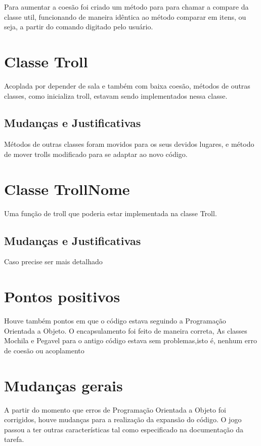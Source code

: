 \documentclass[runningheads,a4paper]{llncs}
\begin{document}
Para aumentar a coesão foi criado um método para para chamar a compare da classe util, funcionando de maneira idêntica ao método comparar em itens, ou seja, a partir do comando digitado pelo usuário. 

\section{Classe Troll}

Acoplada por depender de sala e também com baixa coesão, métodos de outras classes, como inicializa troll, estavam sendo implementados nessa classe.

\subsection{Mudanças e Justificativas}

Métodos de outras classes foram movidos para os seus devidos lugares, e método de mover trolls modificado para se adaptar ao novo código.

\section{Classe TrollNome}

Uma função de troll que poderia estar implementada na classe Troll. 

\subsection{Mudanças e Justificativas}

Caso precise ser mais detalhado

\section{Pontos positivos}

Houve também pontos em que o código estava seguindo a Programação Orientada a Objeto. O encapsulamento foi feito de maneira correta, As classes Mochila e Pegavel para o antigo código estava sem problemas,isto é, nenhum erro de coesão ou acoplamento 

\section{Mudanças gerais}

A partir do momento que erros de Programação Orientada a Objeto foi corrigidos, houve mudanças para a realização da expansão do código. O jogo passou a ter outras características tal como especificado na documentação da tarefa.
\end{document}
